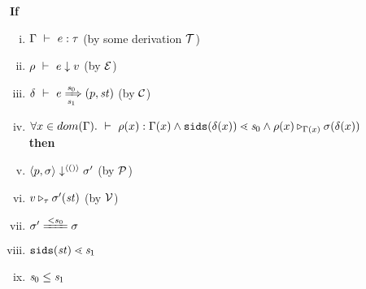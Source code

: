 \begin{thm}
	\label{main-correctness}
	\textbf{If} 
	\begin{enumerate}[(i)]
		\item $\Type{\Gam}{e}{\tau}$ (by some derivation $\MT$)
		\item $\Eval{\rho}{e}{v}$ (by $\ME$) 
		\item $\Trans{\del}{e}{\s_0}{\s_1}{\sfun{p}{\st}}$ (by $\MC$)
		\item $\forall x \in dom(\Gam). \Type{}{\rho(x)}{\Gam(x) } \wedge \sids{\del(x)} \SetLe \s_0  \wedge  \ValRep{\rho(x)}{\Gam(x)}{\sgm(\del(x))}$ \\
	\textbf{then} 
		\item $\seval{p}{\sgm}{\singl{()}}{\sgm'}$ (by $\MP$)
		\item  $\ValRep{v}{\tau}{\sgm'(\st)}$ (by $\MV$)
		\item $\sgm' \ConEq{s_0} \sgm $
		\item  $\sids{\st} \SetLe \s_1$
		\item $\s_0 \le \s_1$
	\end{enumerate} 
\end{thm}

